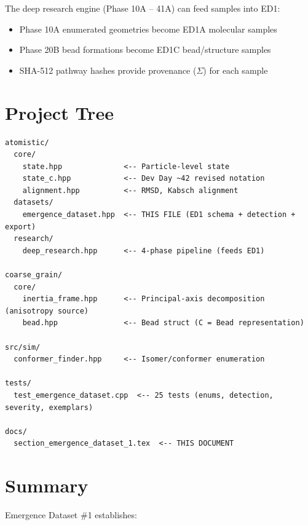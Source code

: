 \documentclass[11pt]{article}
\begin{document}
The deep research engine (Phase 10A -- 41A) can feed samples into ED1:
\begin{itemize}
  \item Phase 10A enumerated geometries become ED1A molecular samples
  \item Phase 20B bead formations become ED1C bead/structure samples
  \item SHA-512 pathway hashes provide provenance ($\Sigma$) for each sample
\end{itemize}

\section{Project Tree}

\begin{lstlisting}[basicstyle=\ttfamily\scriptsize]
atomistic/
  core/
    state.hpp              <-- Particle-level state
    state_c.hpp            <-- Dev Day ~42 revised notation
    alignment.hpp          <-- RMSD, Kabsch alignment
  datasets/
    emergence_dataset.hpp  <-- THIS FILE (ED1 schema + detection + export)
  research/
    deep_research.hpp      <-- 4-phase pipeline (feeds ED1)

coarse_grain/
  core/
    inertia_frame.hpp      <-- Principal-axis decomposition (anisotropy source)
    bead.hpp               <-- Bead struct (C = Bead representation)

src/sim/
  conformer_finder.hpp     <-- Isomer/conformer enumeration

tests/
  test_emergence_dataset.cpp  <-- 25 tests (enums, detection, severity, exemplars)

docs/
  section_emergence_dataset_1.tex  <-- THIS DOCUMENT
\end{lstlisting}

\section{Summary}

Emergence Dataset \#1 establishes:
\end{document}
